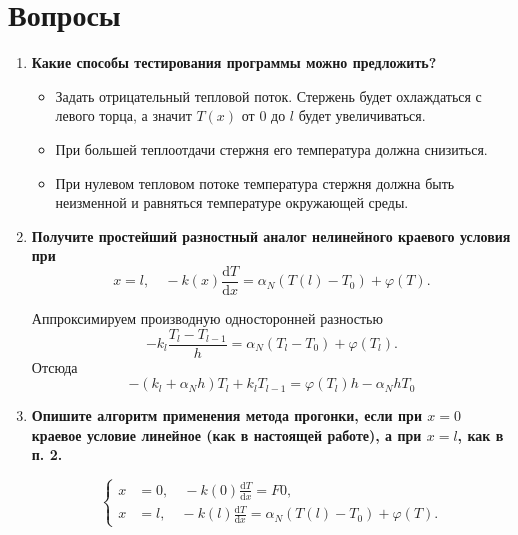 \documentclass[a4paper,oneside,12pt]{extreport}
\begin{document}
\section*{Вопросы}

\begin{enumerate}
	\item \textbf{Какие способы тестирования программы можно предложить?}

	\begin{itemize}
		\item Задать отрицательный тепловой поток.
		Стержень будет охлаждаться с левого торца, а значит $T(x)$ от $0$ до $l$ будет увеличиваться.

		\item При большей теплоотдачи стержня его температура должна снизиться.

		\item При нулевом тепловом потоке температура стержня должна быть неизменной и равняться температуре окружающей среды.
	\end{itemize}

	\item \textbf{Получите простейший разностный аналог нелинейного краевого условия при}
	\begin{equation}
		x=l,\quad-k(x)\frac{\mathrm dT}{\mathrm dx} = \alpha_N\left(T(l)-T_0\right)+\varphi(T).
	\end{equation}

	Аппроксимируем производную односторонней разностью
	\begin{equation}
		-k_l\frac{T_l-T_{l-1}}h=\alpha_N(T_l-T_0)+\varphi(T_l).
	\end{equation}
	Отсюда
	\begin{equation}
		-(k_l+\alpha_Nh)T_l+k_lT_{l-1}=\varphi(T_l)h-\alpha_NhT_0
	\end{equation}


	\item \textbf{Опишите алгоритм применения метода прогонки, если при $x=0$ краевое условие линейное (как в настоящей работе), а при $x=l$, как в п. 2.}

	\begin{equation}
		\left\{
		\begin{aligned}
			x&=0,\quad-k(0)\frac{\mathrm dT}{\mathrm dx}=F0,\\
			x&=l,\quad-k(l)\frac{\mathrm dT}{\mathrm dx}=\alpha_N(T(l)-T_0)+\varphi(T).
		\end{aligned}
		\right.
	\end{equation}


\end{enumerate}
\end{document}

